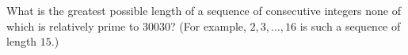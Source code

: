 What is the greatest possible length of a sequence of consecutive integers none of which is relatively prime to $30030$? (For example, $2,3,\dots,16$ is such a sequence of length $15$.)
